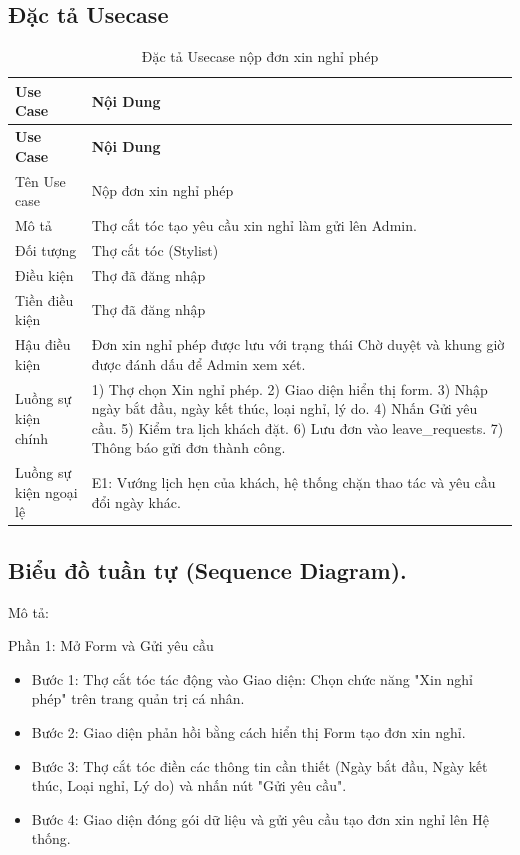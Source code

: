\documentclass[../BTL.tex]{subfiles}
\begin{document}
\subsection{Đặc tả Usecase}
\begin{longtable}{|p{}|p{}|}
\caption{Đặc tả Usecase nộp đơn xin nghỉ phép}\label{tab:usecase-xin-nghi-phep}\\
\hline
\textbf{Use Case} & \textbf{Nội Dung} \\
\hline
\endfirsthead
\hline
\textbf{Use Case} & \textbf{Nội Dung} \\
\hline
\endhead
Tên Use case & Nộp đơn xin nghỉ phép \\
\hline
Mô tả & Thợ cắt tóc tạo yêu cầu xin nghỉ làm gửi lên Admin. \\
\hline
Đối tượng & Thợ cắt tóc (Stylist) \\
\hline
Điều kiện & Thợ đã đăng nhập \\
\hline
Tiền điều kiện & Thợ đã đăng nhập \\
\hline
Hậu điều kiện & Đơn xin nghỉ phép được lưu với trạng thái Chờ duyệt và khung giờ được đánh dấu để Admin xem xét. \\
\hline
Luồng sự kiện chính & 1) Thợ chọn Xin nghỉ phép. 2) Giao diện hiển thị form. 3) Nhập ngày bắt đầu, ngày kết thúc, loại nghỉ, lý do. 4) Nhấn Gửi yêu cầu. 5) Kiểm tra lịch khách đặt. 6) Lưu đơn vào leave\_requests. 7) Thông báo gửi đơn thành công. \\
\hline
Luồng sự kiện ngoại lệ & E1: Vướng lịch hẹn của khách, hệ thống chặn thao tác và yêu cầu đổi ngày khác. \\
\hline
\end{longtable}

\subsection{Biểu đồ tuần tự (Sequence Diagram).}

Mô tả:

Phần 1: Mở Form và Gửi yêu cầu

\begin{itemize}
\item
  Bước 1: Thợ cắt tóc tác động vào Giao diện: Chọn chức năng "Xin nghỉ
  phép" trên trang quản trị cá nhân.
\item
  Bước 2: Giao diện phản hồi bằng cách hiển thị Form tạo đơn xin nghỉ.
\item
  Bước 3: Thợ cắt tóc điền các thông tin cần thiết (Ngày bắt đầu, Ngày
  kết thúc, Loại nghỉ, Lý do) và nhấn nút "Gửi yêu cầu".
\item
  Bước 4: Giao diện đóng gói dữ liệu và gửi yêu cầu tạo đơn xin nghỉ lên
  Hệ thống.
\end{itemize}
\end{document}
